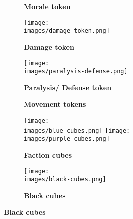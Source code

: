 \begin{figure}[H]
  \centering
  \begin{subfigure}[b]{0.2\linewidth}
    \caption{\textbf{Morale token}}
  \end{subfigure}
  \begin{subfigure}[b]{0.1\linewidth}
    \centering
    \texttt{[image: \\images/damage-token.png]}
    \caption{\textbf{Damage token}}
  \end{subfigure}
  \begin{subfigure}[b]{0.17\linewidth}
    \centering
    \texttt{[image: \\images/paralysis-defense.png]}
    \caption{\textbf{Paralysis/ Defense token}}
  \end{subfigure}
  \begin{subfigure}[b]{0.15\linewidth}
    \centering
    
    \caption{\textbf{Movement tokens}}
  \end{subfigure}
  \begin{subfigure}[b]{0.15\linewidth}
    \centering
    \texttt{[image: \\images/blue-cubes.png]}
    \texttt{[image: \\images/purple-cubes.png]}
    \caption{\textbf{Faction cubes}}
  \end{subfigure}
  \begin{subfigure}[b]{0.15\linewidth}
    \centering
    \texttt{[image: \\images/black-cubes.png]}
    \caption{\textbf{Black cubes}}
  \end{subfigure}
\end{figure}
\vspace*{-2em}
